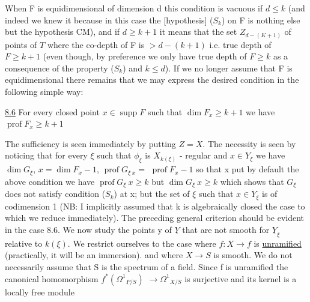 
When F is equidimensional of dimension d this condition is vacuous
if $d \leq k$ (and indeed we knew it because in this case the
[hypothesis] ($S_k$) on F is nothing else but the hypothesis CM), and
if $d \geq k + 1$ it means that the set $Z_{d-(K + 1)}$ of points of $T$ where
the co-depth of F is $> d - (k + 1)$ i.e. true depth of $F \geq k + 1$
(even though, by preference we only have true depth of $F \geq k$ as a
consequence of the property ($S_k$) and $k \leq d$). If we no longer
assume that F is equidimensional there remains that we may express
the desired condition in the following simple way:

\uline{8.6} For every closed point $x \in \operatorname{supp} F$ such that $\dim F_x \geq k + 1$ we
have $\operatorname{prof} F_x \geq k + 1$

The sufficiency is seen immediately by putting $Z = X$. The
necessity is seen by noticing that for every $\xi$ such that $\phi_\xi$ is $X_{k(\xi)}$
- regular and $x \in Y_\xi$ we have $\dim G_\xi$, $x = \dim F_x - 1$, $\operatorname{prof} G_{\xi\; x} =$
$\operatorname{prof} F_x - 1$ so that x put by default the above condition we have
$\operatorname{prof} G_\xi\ x \geq k$ but $\dim G_\xi\ x \geq k$ which shows that $G_\xi$ does not satisfy
condition ($S_k$) at x; but the set of $\xi$ such that $x \in Y_\xi$ is of
codimension 1 (NB: I implicitly assumed that k is algebraically
closed the case to which we reduce immediately). The preceding
general criterion should be evident in the case 8.6. We now study
the points y of $\underline{Y}$ that are not smooth for $\underline{Y}_\xi$ relative to $k(\xi)$. We
restrict ourselves to the case where $f\colon X \to f$ is \uline{unramified}
(practically, it will be an immersion). and where $X \to S$ is
smooth. We do not necessarily assume that S is the spectrum of a
field. Since f is unramified the canonical homomorphism $f^*(\Omega^1{}_{\underline{P}/S})$
$\to \Omega^1{}_{X/S}$ is surjective and its kernel is a locally free module

